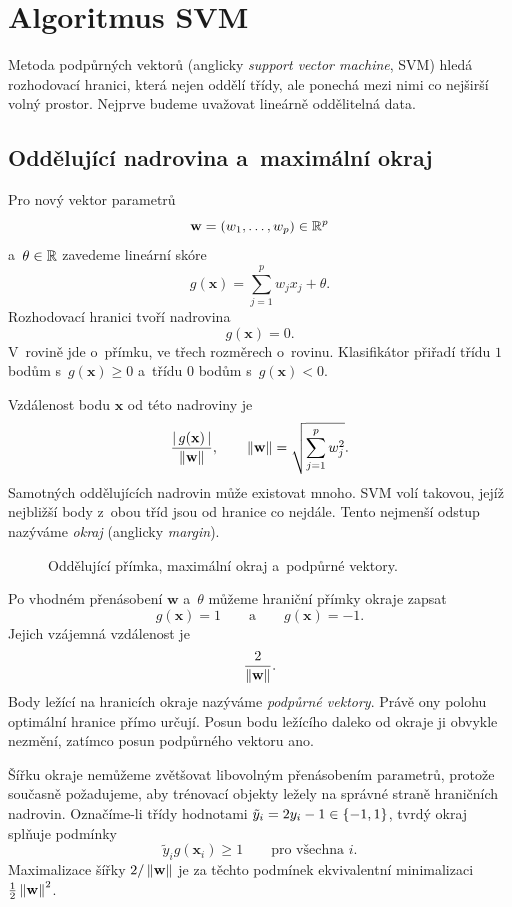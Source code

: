 \section{Algoritmus SVM}\label{sec:ai-svm}

Metoda podpůrných vektorů (anglicky \emph{support vector machine}, SVM) hledá rozhodovací hranici, která nejen oddělí třídy, ale ponechá mezi nimi co nejširší volný prostor. Nejprve budeme uvažovat lineárně oddělitelná data.

\subsection{Oddělující nadrovina a~maximální okraj}

Pro nový vektor parametrů
\[
    \mathbf{w}=(w_1,\ldots,w_p)\in\mathbb{R}^p
\]
a~\(\theta\in\mathbb{R}\) zavedeme lineární skóre
\[
    g(\mathbf{x})
    =
    \sum_{j=1}^{p}w_jx_j+\theta.
\]
Rozhodovací hranici tvoří nadrovina
\[
    g(\mathbf{x})=0.
\]
V~rovině jde o~přímku, ve třech rozměrech o~rovinu. Klasifikátor přiřadí třídu \(1\) bodům s~\(g(\mathbf{x})\geqslant0\) a~třídu \(0\) bodům s~\(g(\mathbf{x})<0\).

Vzdálenost bodu \(\mathbf{x}\) od této nadroviny je
\[
    \frac{\left|\,g(\mathbf{x})\,\right|}{\left\lVert\mathbf{w}\right\rVert},
    \qquad
    \left\lVert\mathbf{w}\right\rVert
    =
    \sqrt{\sum_{j=1}^{p}w_j^2}.
\]
Samotných oddělujících nadrovin může existovat mnoho. SVM volí takovou, jejíž nejbližší body z~obou tříd jsou od hranice co nejdále. Tento nejmenší odstup nazýváme \emph{okraj} (anglicky \emph{margin}).

\begin{figure}[ht]
    \centering
    
    \caption{Oddělující přímka, maximální okraj a~podpůrné vektory.}
    \label{fig:ai-svm}
\end{figure}

Po vhodném přenásobení \(\mathbf{w}\) a~\(\theta\) můžeme hraniční přímky okraje zapsat
\[
    g(\mathbf{x})=1
    \qquad\text{a}\qquad
    g(\mathbf{x})=-1.
\]
Jejich vzájemná vzdálenost je
\[
    \frac{2}{\left\lVert\mathbf{w}\right\rVert}.
\]
Body ležící na hranicích okraje nazýváme \emph{podpůrné vektory}. Právě ony polohu optimální hranice přímo určují. Posun bodu ležícího daleko od okraje ji obvykle nezmění, zatímco posun podpůrného vektoru ano.

Šířku okraje nemůžeme zvětšovat libovolným přenásobením parametrů, protože současně požadujeme, aby trénovací objekty ležely na správné straně hraničních nadrovin. Označíme-li třídy hodnotami \(\tilde y_i=2y_i-1\in\left\{-1,1\right\}\), tvrdý okraj splňuje podmínky
\[
    \tilde y_i g(\mathbf{x}_i)\geqslant1
    \qquad\text{pro všechna }i.
\]
Maximalizace šířky \(2/\left\lVert\mathbf{w}\right\rVert\) je za těchto podmínek ekvivalentní minimalizaci \(\frac12\left\lVert\mathbf{w}\right\rVert^2\).

